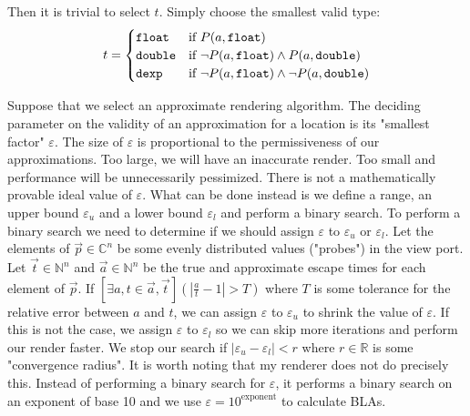 \documentclass{article}
\begin{document}
Then it is trivial to select $t$. Simply choose the smallest valid type:
\[
    t = \begin{cases} 
        \verb|float| & \text{if } P(a, \verb|float|) \\
        \verb|double| & \text{if }  \lnot P(a, \verb|float|) \land P(a, \verb|double|) ~\\
        \verb|dexp| & \text{if } \lnot P(a, \verb|float|) \land \lnot P(a, \verb|double|) 
    \end{cases}
\]
\par Suppose that we select an approximate rendering algorithm. The deciding parameter on the validity of an approximation for a location is its "smallest factor" $\varepsilon$. The size of $\varepsilon$ is proportional to the permissiveness of our approximations. Too large, we will have an inaccurate render. Too small and performance will be unnecessarily pessimized. There is not a mathematically provable ideal value of $\varepsilon$. What can be done instead is we define a range, an upper bound $\varepsilon_u$ and a lower bound $\varepsilon_l$ and perform a binary search. To perform a binary search we need to determine if we should assign $\varepsilon$ to $\varepsilon_u$ or $\varepsilon_l$. Let the elements of $\vec{p}\in \mathbb{C}^n$ be some evenly distributed values ("probes") in the view port. Let $\vec{t}\in\mathbb{N}^{n}$ and $\vec{a}\in\mathbb{N}^{n}$ be the true and approximate escape times for each element of $\vec{p}$. If $[\exists a,t\in\vec{a},\vec{t}](|\frac{a}{t} - 1| > T)$ where $T$ is some tolerance for the relative error between $a$ and $t$, we can assign $\varepsilon$ to $\varepsilon_u$ to shrink the value of $\varepsilon$. If this is not the case, we assign $\varepsilon$ to $\varepsilon_l$ so we can skip more iterations and perform our render faster. We stop our search if $|\varepsilon_u - \varepsilon_l| < r$ where $r\in\mathbb{R}$ is some "convergence radius".
It is worth noting that my renderer does not do precisely this. Instead of performing a binary search for $\varepsilon$, it performs a binary search on an exponent of base 10 and we use $\varepsilon=10^{\textrm{exponent}}$ to calculate BLAs.
\end{document}
